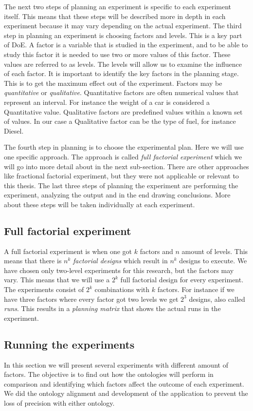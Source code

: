 \documentclass{llncs}
\begin{document}
The next two steps of planning an experiment is specific to each
experiment itself. This means that these steps will be described more
in depth in each experiment because it may vary depending on the
actual experiment.  The third step in planning an experiment is
choosing factors and levels. This is a key part of DoE. A factor is a
variable that is studied in the experiment, and to be able to study
this factor it is needed to use two or more values of this
factor. These values are referred to as levels.  The levels will allow
us to examine the influence of each factor. It is important to
identify the key factors in the planning stage. This is to get the
maximum effect out of the experiment.  Factors may be
\emph{quantitative} or \emph{qualitative}. Quantitative factors
are often numerical values that represent an interval. For instance
the weight of a car is considered a Quantitative value. Qualitative
factors are predefined values within a known set of values.  In our
case a Qualitative factor can be the type of fuel, for instance
Diesel.

The fourth step in planning is to choose the experimental plan. Here
we will use one specific approach. The approach is called \emph{full
  factorial experiment} which we will go into more detail about in the
next sub-section. There are other approaches like fractional factorial
experiment, but they were not applicable or relevant to this thesis.
The last three steps of planning the experiment are performing the
experiment, analyzing the output and in the end drawing
conclusions. More about these steps will be taken individually at each
experiment. 


\subsection{Full factorial experiment}
A full factorial experiment is when one got $k$ factors and $n$ amount
of levels. This means that there is $n^k$ \emph{factorial designs}
which result in $n^k$ designs to execute.  We have chosen only
two-level experiments for this research, but the factors may vary. This
means that we will use a $2^k$ full factorial design for every
experiment. The experiments consist of $2^k$ combinations with $k$
factors. For instance if we have three factors where every factor got
two levels we get $2^3$ designs, also called \emph{runs}. This results
in a \emph{planning matrix} that shows the actual runs in the
experiment.




\subsection{Running the experiments}
In this section we will present several experiments with different
amount of factors.  The objective is to find out how the ontologies
will perform in comparison and identifying which factors affect the
outcome of each experiment. We did the ontology alignment and
development of the application to prevent the loss of precision with
either ontology.
\end{document}
